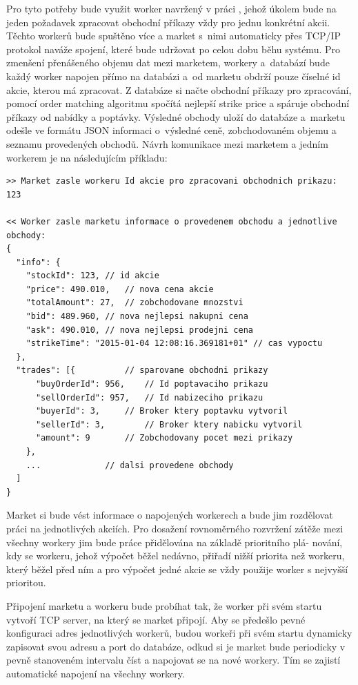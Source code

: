 \documentclass[thesis=M,czech]{FITthesis}[2012/06/26]
\begin{document}
	Pro tyto potřeby bude využit worker navržený v práci \cite{Fremunt2014}, jehož úkolem bude na jeden požadavek zpracovat obchodní příkazy vždy pro jednu konkrétní akcii. Těchto workerů bude spuštěno více a market s~nimi automaticky přes TCP/IP protokol naváže spojení, které bude udržovat po celou dobu běhu systému. Pro zmenšení přenášeného objemu dat mezi marketem, workery a~databází bude každý worker napojen přímo na databázi a~od marketu obdrží pouze číselné id akcie, kterou má zpracovat. Z databáze si načte obchodní příkazy pro zpracování, pomocí order matching algoritmu spočítá nejlepší strike price a spáruje obchodní příkazy od nabídky a poptávky. Výsledné obchody uloží do databáze a~marketu odešle ve formátu JSON informaci o~výsledné ceně, zobchodovaném objemu a seznamu provedených obchodů. Návrh komunikace mezi marketem a jedním workerem je na následujícím příkladu:


\begin{lstlisting}[basicstyle={\tiny\ttfamily}, frame=single] 
>> Market zasle workeru Id akcie pro zpracovani obchodnich prikazu:
123

<< Worker zasle marketu informace o provedenem obchodu a jednotlive obchody:
{
  "info": {
    "stockId": 123,	// id akcie
    "price": 490.010,	// nova cena akcie
    "totalAmount": 27,	// zobchodovane mnozstvi
    "bid": 489.960,	// nova nejlepsi nakupni cena
    "ask": 490.010,	// nova nejlepsi prodejni cena
    "strikeTime": "2015-01-04 12:08:16.369181+01" // cas vypoctu
  },
  "trades": [{ 			// sparovane obchodni prikazy
      "buyOrderId": 956, 	// Id poptavaciho prikazu
      "sellOrderId": 957,	// Id nabizeciho prikazu
      "buyerId": 3,		// Broker ktery poptavku vytvoril
      "sellerId": 3,		// Broker ktery nabicku vytvoril
      "amount": 9 		// Zobchodovany pocet mezi prikazy
    },
    ... 			// dalsi provedene obchody
  ]
}
\end{lstlisting}
	
	Market si bude vést informace o napojených workerech a bude jim rozdělovat práci na jednotlivých akciích. Pro dosažení rovnoměrného rozvržení zátěže mezi všechny workery jim bude práce přidělována na základě prioritního plá- nování, kdy se workeru, jehož výpočet běžel nedávno, přiřadí nižší priorita než workeru, který běžel před ním a pro výpočet jedné akcie se vždy použije worker s nejvyšší prioritou.
	
	Připojení marketu a workeru bude probíhat tak, že worker při svém startu vytvoří TCP server, na který se market připojí. Aby se předešlo pevné konfiguraci adres jednotlivých workerů, budou workeři při svém startu dynamicky zapisovat svou adresu a port do databáze, odkud si je market bude periodicky v pevně stanoveném intervalu číst a napojovat se na nové workery. Tím se zajistí automatické napojení na všechny workery.
	
\end{document}
